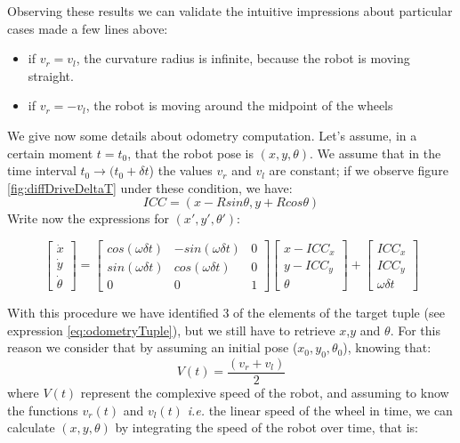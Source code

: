 Observing these results we can validate the intuitive impressions about particular cases made a few lines above:
\begin{itemize}
	\item if $v_r=v_l$, the curvature radius is infinite, because the robot is moving straight.
	\item if $v_r=-v_l$, the robot is moving around the midpoint of the wheels
\end{itemize}
We give now some details about odometry computation. Let's assume, in a certain moment $t=t_0$, that the robot pose is $(x,y,\theta)$. We assume that in the time interval $t_0\rightarrow (t_0 +\delta t$) the values $v_r$ and $v_l$ are constant; if we observe figure \ref{fig:diffDriveDeltaT} under these condition, we have:
\begin{equation}
	ICC=(x-Rsin\theta, y+Rcos\theta)
\end{equation}
Write now the expressions for $(x',y',\theta')$:

\[
\begin{bmatrix}
\dot{x} \\
\dot{y} \\
\dot{\theta}
\end{bmatrix}
 = 
\begin{bmatrix}
cos(\omega \delta t) & -sin(\omega \delta t) & 0 \\
sin(\omega \delta t)  & cos(\omega \delta t) & 0 \\
0                                       & 0                                      & 1
\end{bmatrix}
\begin{bmatrix}
x-ICC_x\\
y-ICC _y\\
\theta
\end{bmatrix}
+
\begin{bmatrix}
ICC_x \\
ICC_y \\
\omega \delta t
\end{bmatrix}
\]

With this procedure we have identified 3 of the elements of the target tuple (see expression \ref{eq:odometryTuple}), but we still have to retrieve $x$,$y$ and $\theta$. For this reason we consider that by assuming an initial pose ($x_0, y_0, \theta_0$), knowing that:
\begin{equation}
	V(t)=\frac{(v_r+v_l)}{2}
\end{equation}
where $V(t)$ represent the complexive speed of the robot, and assuming to know the functions $v_r(t)$ and $v_l(t)$ \textit{i.e.} the linear speed of the wheel in time, we can calculate $(x,y,\theta)$ by integrating the speed of the robot over time, that is:

